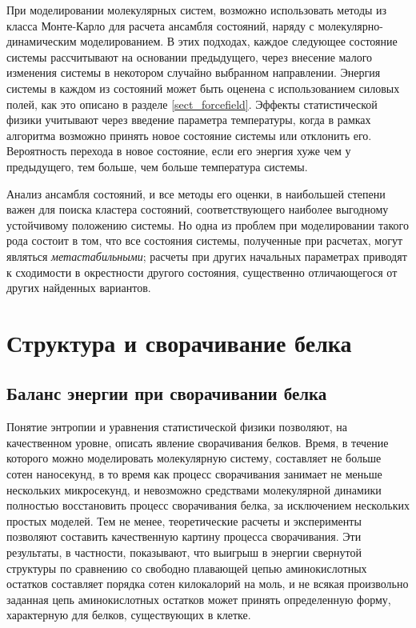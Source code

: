При моделировании молекулярных систем, возможно использовать методы из класса Монте-Карло для расчета ансамбля состояний, наряду с молекулярно-динамическим моделированием. В этих подходах, каждое следующее состояние системы рассчитывают на основании предыдущего, через внесение малого изменения системы в некотором случайно выбранном направлении. Энергия системы в каждом из состояний может быть оценена с использованием силовых полей, как это описано в разделе \ref{sect_forcefield}. Эффекты статистической физики учитывают через введение параметра температуры, когда в рамках алгоритма возможно принять новое состояние системы или отклонить его. Вероятность перехода в новое состояние, если его энергия хуже чем у предыдущего, тем больше, чем больше температура системы.

Анализ ансамбля состояний, и все методы его оценки, в наибольшей степени важен для поиска кластера состояний, соответствующего наиболее выгодному устойчивому положению системы. Но одна из проблем при моделировании такого рода состоит в том, что все состояния системы, полученные при расчетах, могут являться \textit{метастабильными}; расчеты при других начальных параметрах приводят к сходимости в окрестности другого состояния, существенно отличающегося от других найденных вариантов.


\section{Структура и сворачивание белка} \label{sect5_1}	

\subsection{Баланс энергии при сворачивании белка}        

Понятие энтропии и уравнения статистической физики позволяют, на качественном уровне, описать явление сворачивания белков. Время, в течение которого можно моделировать молекулярную систему, составляет не больше сотен наносекунд, в то время как процесс сворачивания занимает не меньше нескольких микросекунд, и невозможно средствами молекулярной динамики полностью восстановить процесс сворачивания белка, за исключением нескольких простых моделей. Тем не менее, теоретические расчеты и эксперименты позволяют составить качественную картину процесса сворачивания. Эти результаты, в частности, показывают, что выигрыш в энергии свернутой структуры по сравнению со свободно плавающей цепью аминокислотных остатков составляет порядка сотен килокалорий на моль, и не всякая произвольно заданная цепь аминокислотных остатков может принять определенную форму, характерную для белков, существующих в клетке. 

